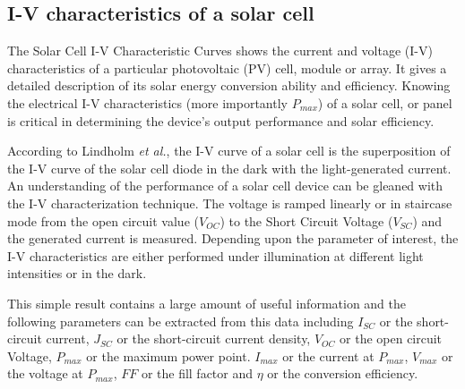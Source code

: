 \documentclass[%
 aip,
 amsmath,amssymb,
 reprint, floatfix%
]{revtex4-2}
\begin{document}
    \subsection{I-V characteristics of a solar cell}
    The Solar Cell I-V Characteristic Curves shows the current and voltage (I-V) characteristics of a particular photovoltaic (PV) cell, module or array. It gives a detailed description of its solar energy conversion ability and efficiency. Knowing the electrical I-V characteristics (more importantly $P_{max}$) of a solar cell, or panel is critical in determining the device’s output performance and solar efficiency.
    \par
    According to Lindholm \textit{et al.}, the I-V curve of a solar cell is the superposition of the I-V curve of the solar cell diode in the dark with the light-generated current. An understanding of the performance of a solar cell device can be gleaned with the I-V characterization technique. The voltage is ramped linearly or in staircase mode from the open circuit value ($V_{OC}$) to the Short Circuit Voltage ($V_{SC}$) and the generated current is measured. Depending upon the parameter of interest, the I-V characteristics are either performed under illumination at different light intensities or in the dark.
    \par
    This simple result contains a large amount of useful information and the following parameters can be extracted from this data including $I_{SC}$ or the short-circuit current, $J_{SC}$ or the short-circuit current density, $V_{OC}$ or the open circuit Voltage, $P_{max}$ or the maximum power point. $I_{max}$ or the current at $P_{max}$, $V_{max}$ or the voltage at $P_{max}$, $FF$ or the fill factor and $\eta$ or the conversion efficiency.
\end{document}
